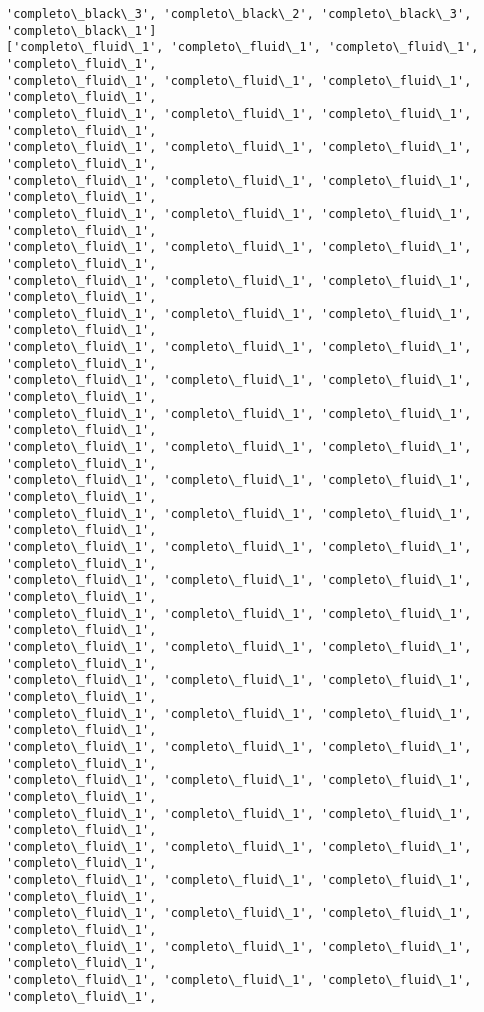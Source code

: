 \documentclass[11pt]{article}
\begin{document}
\begin{Verbatim}[commandchars=\\\{\}]
'completo\_black\_3', 'completo\_black\_2', 'completo\_black\_3', 'completo\_black\_1']
['completo\_fluid\_1', 'completo\_fluid\_1', 'completo\_fluid\_1', 'completo\_fluid\_1',
'completo\_fluid\_1', 'completo\_fluid\_1', 'completo\_fluid\_1', 'completo\_fluid\_1',
'completo\_fluid\_1', 'completo\_fluid\_1', 'completo\_fluid\_1', 'completo\_fluid\_1',
'completo\_fluid\_1', 'completo\_fluid\_1', 'completo\_fluid\_1', 'completo\_fluid\_1',
'completo\_fluid\_1', 'completo\_fluid\_1', 'completo\_fluid\_1', 'completo\_fluid\_1',
'completo\_fluid\_1', 'completo\_fluid\_1', 'completo\_fluid\_1', 'completo\_fluid\_1',
'completo\_fluid\_1', 'completo\_fluid\_1', 'completo\_fluid\_1', 'completo\_fluid\_1',
'completo\_fluid\_1', 'completo\_fluid\_1', 'completo\_fluid\_1', 'completo\_fluid\_1',
'completo\_fluid\_1', 'completo\_fluid\_1', 'completo\_fluid\_1', 'completo\_fluid\_1',
'completo\_fluid\_1', 'completo\_fluid\_1', 'completo\_fluid\_1', 'completo\_fluid\_1',
'completo\_fluid\_1', 'completo\_fluid\_1', 'completo\_fluid\_1', 'completo\_fluid\_1',
'completo\_fluid\_1', 'completo\_fluid\_1', 'completo\_fluid\_1', 'completo\_fluid\_1',
'completo\_fluid\_1', 'completo\_fluid\_1', 'completo\_fluid\_1', 'completo\_fluid\_1',
'completo\_fluid\_1', 'completo\_fluid\_1', 'completo\_fluid\_1', 'completo\_fluid\_1',
'completo\_fluid\_1', 'completo\_fluid\_1', 'completo\_fluid\_1', 'completo\_fluid\_1',
'completo\_fluid\_1', 'completo\_fluid\_1', 'completo\_fluid\_1', 'completo\_fluid\_1',
'completo\_fluid\_1', 'completo\_fluid\_1', 'completo\_fluid\_1', 'completo\_fluid\_1',
'completo\_fluid\_1', 'completo\_fluid\_1', 'completo\_fluid\_1', 'completo\_fluid\_1',
'completo\_fluid\_1', 'completo\_fluid\_1', 'completo\_fluid\_1', 'completo\_fluid\_1',
'completo\_fluid\_1', 'completo\_fluid\_1', 'completo\_fluid\_1', 'completo\_fluid\_1',
'completo\_fluid\_1', 'completo\_fluid\_1', 'completo\_fluid\_1', 'completo\_fluid\_1',
'completo\_fluid\_1', 'completo\_fluid\_1', 'completo\_fluid\_1', 'completo\_fluid\_1',
'completo\_fluid\_1', 'completo\_fluid\_1', 'completo\_fluid\_1', 'completo\_fluid\_1',
'completo\_fluid\_1', 'completo\_fluid\_1', 'completo\_fluid\_1', 'completo\_fluid\_1',
'completo\_fluid\_1', 'completo\_fluid\_1', 'completo\_fluid\_1', 'completo\_fluid\_1',
'completo\_fluid\_1', 'completo\_fluid\_1', 'completo\_fluid\_1', 'completo\_fluid\_1',
'completo\_fluid\_1', 'completo\_fluid\_1', 'completo\_fluid\_1', 'completo\_fluid\_1',
'completo\_fluid\_1', 'completo\_fluid\_1', 'completo\_fluid\_1', 'completo\_fluid\_1',
'completo\_fluid\_1', 'completo\_fluid\_1', 'completo\_fluid\_1', 'completo\_fluid\_1',

\end{Verbatim}
\end{document}
